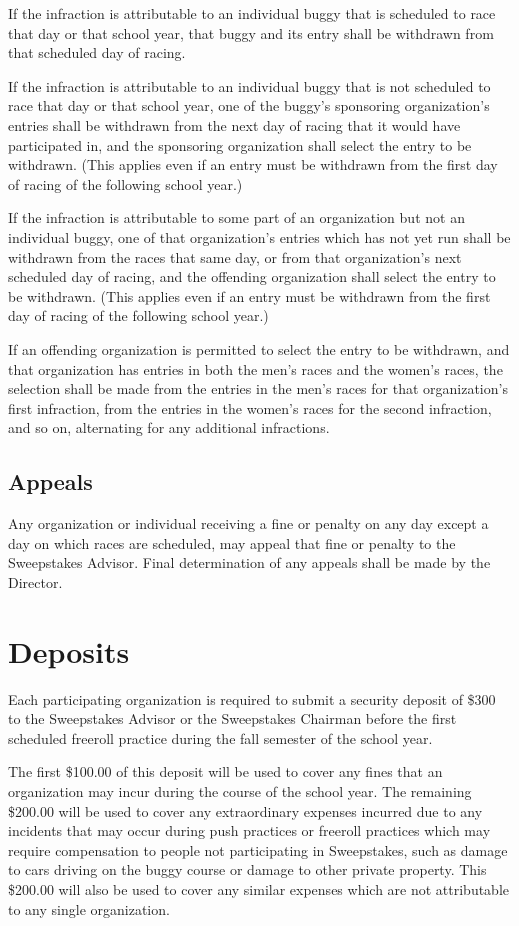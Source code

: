 If the infraction is attributable to an individual buggy that is scheduled to race that day or that school year, that buggy and its entry shall be withdrawn from that scheduled day of racing.

If the infraction is attributable to an individual buggy that is not scheduled to race that day or that school year, one of the buggy's sponsoring organization's entries shall be withdrawn from the next day of racing that it would have participated in, and the sponsoring organization shall select the entry to be withdrawn. (This applies even if an entry must be withdrawn from the first day of racing of the following school year.)

If the infraction is attributable to some part of an organization but not an individual buggy, one of that organization's entries which has not yet run shall be withdrawn from the races that same day, or from that organization's next scheduled day of racing, and the offending organization shall select the entry to be withdrawn. (This applies even if an entry must be withdrawn from the first day of racing of the following school year.)

If an offending organization is permitted to select the entry to be withdrawn, and that organization has entries in both the men's races and the women's races, the selection shall be made from the entries in the men's races for that organization's first infraction, from the entries in the women's races for the second infraction, and so on, alternating for any additional infractions.

\subsection{Appeals}
Any organization or individual receiving a fine or penalty on any day except a day on which races are scheduled, may appeal that fine or penalty to the Sweepstakes Advisor. Final determination of any appeals shall be made by the Director.

\section{Deposits}
Each participating organization is required to submit a security deposit of \$300 to the Sweepstakes Advisor or the Sweepstakes Chairman before the first scheduled freeroll practice during the fall semester of the school year.

The first \$100.00 of this deposit will be used to cover any fines that an organization may incur during the course of the school year. The remaining \$200.00 will be used to cover any extraordinary expenses incurred due to any incidents that may occur during push practices or freeroll practices which may require compensation to people not participating in Sweepstakes, such as damage to cars driving on the buggy course or damage to other private property. This \$200.00 will also be used to cover any similar expenses which are not attributable to any single organization.


